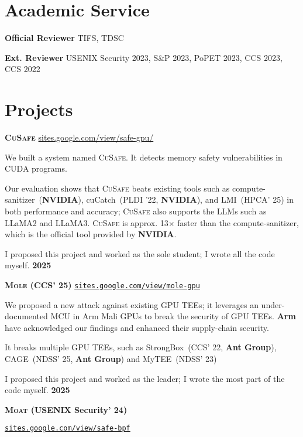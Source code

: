 \documentclass{resume}
\begin{document}
\section{Academic Service}
\begin{content}
  {\bf Official Reviewer} \enspace TIFS, TDSC

		{\bf Ext. Reviewer} \enspace USENIX Security 2023, S\&P 2023, PoPET 2023, CCS 2023, CCS 2022
\end{content}

\section{Projects}

\begin{content}
  {\bf \textbf{\textsc{CuSafe}}} \enspace
  {\href{https://sites.google.com/view/safe-gpu/}{sites.google.com/view/safe-gpu/}}

  {We built a system named \textsc{CuSafe}. It detects memory safety vulnerabilities in CUDA programs.}

  {Our evaluation shows that \textsc{CuSafe} beats existing tools such as compute-sanitizer~(\textbf{NVIDIA}), cuCatch~(PLDI '22, \textbf{NVIDIA}), and LMI~(HPCA' 25) in both performance and accuracy; \textsc{CuSafe} also supports the LLMs such as LLaMA2 and LLaMA3. \textsc{CuSafe} is approx. 13$\times$ faster than the compute-sanitizer, which is the official tool provided by \textbf{NVIDIA}.}

  {I proposed this project and worked as the sole student; I wrote all the code myself.}
  \hfill {\bf 2025}


  {\bf \textbf{\textsc{Mole}} (CCS' 25)} \enspace
  {\href{https://sites.google.com/view/mole-gpu}{\texttt{sites.google.com/view/mole-gpu}}}

  {We proposed a new attack against existing GPU TEEs; it leverages an under-documented MCU in Arm Mali GPUs to break the security of GPU TEEs. \textbf{Arm} have acknowledged our findings and enhanced their supply-chain security.}

  {It breaks multiple GPU TEEs, such as StrongBox~(CCS' 22, \textbf{Ant Group}), CAGE~(NDSS' 25, \textbf{Ant Group}) and MyTEE~(NDSS' 23)}

  {I proposed this project and worked as the leader; I wrote the most part of the code myself.}
  \hfill{\bf 2025}


  {\bf \textbf{\textsc{Moat}} (USENIX Security' 24)} \enspace
  {\href{https://sites.google.com/view/safe-bpf/}{\texttt{sites.google.com/view/safe-bpf}}
    
}
\end{content}
\end{document}
